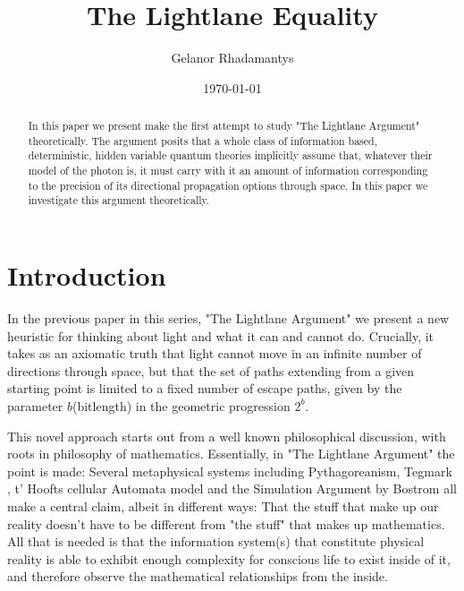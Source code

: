 \documentclass[notitlepage]{article}
\title{The Lightlane Equality}
\author{Gelanor Rhadamantys}
\date{\today}
\begin{document}
\maketitle
\thispagestyle{empty}

\begin{abstract}
In this paper we present make the first attempt to study "The Lightlane Argument" \cite{RhadamantysA1} theoretically. The argument posits that a whole class of information based, deterministic, hidden variable quantum theories implicitly assume that, whatever their model of the photon is, it must carry with it an amount of information corresponding to the precision of its directional propagation options through space. In this paper we investigate this argument theoretically.

\end{abstract}

\section{Introduction}
In the previous  paper in this series, "The Lightlane Argument"  \cite{RhadamantysA1}  we present a new heuristic for thinking about light and what it can and cannot do. Crucially, it takes as an axiomatic truth that light cannot move in an infinite number of directions through space, but that the set of paths extending from a given starting point is limited to a fixed number of escape paths, given by the parameter $ b $(bitlength) in  the geometric progression $2^b $.

This novel approach starts out from a well known philosophical discussion, with roots in philosophy of mathematics. Essentially, in "The Lightlane Argument" the point is made: Several metaphysical systems including Pythagoreanism, Tegmark \cite{Tegmark_2007}, t' Hoofts cellular Automata model \cite{hooft2014cellular} and the Simulation Argument by Bostrom \cite{Bostrom_2003} all make a central claim, albeit in different ways: That the stuff that make up our reality doesn't have to be different from "the stuff" that makes up mathematics. All that is needed is that the information system(s) that constitute physical reality is able to exhibit enough complexity for conscious life to exist inside of it, and therefore observe the mathematical relationships from the inside. 
\end{document}
